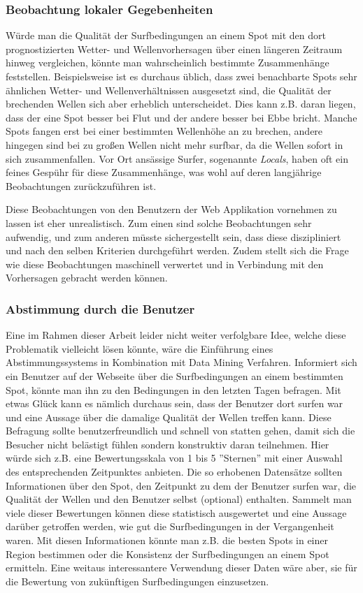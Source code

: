 \subsubsection{Beobachtung lokaler Gegebenheiten}
Würde man die Qualität der Surfbedingungen an einem Spot mit den dort
prognostizierten Wetter- und Wellenvorhersagen über einen längeren
Zeitraum hinweg vergleichen, könnte man wahrscheinlich bestimmte
Zusammenhänge feststellen. Beispielsweise ist es durchaus üblich, dass
zwei benachbarte Spots sehr ähnlichen Wetter- und Wellenverhältnissen
ausgesetzt sind, die Qualität der brechenden Wellen sich aber
erheblich unterscheidet. Dies kann z.B. daran liegen, dass der eine
Spot besser bei Flut und der andere besser bei Ebbe bricht. Manche
Spots fangen erst bei einer bestimmten Wellenhöhe an zu brechen,
andere hingegen sind bei zu großen Wellen nicht mehr surfbar, da die
Wellen sofort in sich zusammenfallen. Vor Ort ansässige Surfer,
sogenannte \textit{Locals}, haben oft ein feines Gespühr für diese
Zusammenhänge, was wohl auf deren langjährige Beobachtungen
zurückzuführen ist.

Diese Beobachtungen von den Benutzern der Web Applikation vornehmen zu
lassen ist eher unrealistisch. Zum einen sind solche Beobachtungen
sehr aufwendig, und zum anderen müsste sichergestellt sein, dass diese
diszipliniert und nach den selben Kriterien durchgeführt werden. Zudem
stellt sich die Frage wie diese Beobachtungen maschinell verwertet und
in Verbindung mit den Vorhersagen gebracht werden können.

\subsubsection{Abstimmung durch die Benutzer}
Eine im Rahmen dieser Arbeit leider nicht weiter verfolgbare Idee,
welche diese Problematik vielleicht lösen könnte, wäre die Einführung
eines Abstimmungssystems in Kombination mit Data Mining
Verfahren. Informiert sich ein Benutzer auf der Webseite über die
Surfbedingungen an einem bestimmten Spot, könnte man ihn zu den
Bedingungen in den letzten Tagen befragen. Mit etwas Glück kann es
nämlich durchaus sein, dass der Benutzer dort surfen war und eine
Aussage über die damalige Qualität der Wellen treffen kann. Diese
Befragung sollte benutzerfreundlich und schnell von statten gehen,
damit sich die Besucher nicht belästigt fühlen sondern konstruktiv
daran teilnehmen. Hier würde sich z.B. eine Bewertungsskala von 1 bis
5 ''Sternen'' mit einer Auswahl des entsprechenden Zeitpunktes
anbieten. Die so erhobenen Datensätze sollten Informationen über den
Spot, den Zeitpunkt zu dem der Benutzer surfen war, die Qualität der
Wellen und den Benutzer selbst (optional) enthalten. Sammelt man viele
dieser Bewertungen können diese statistisch ausgewertet und eine
Aussage darüber getroffen werden, wie gut die Surfbedingungen in der
Vergangenheit waren. Mit diesen Informationen könnte man z.B. die
besten Spots in einer Region bestimmen oder die Konsistenz der
Surfbedingungen an einem Spot ermitteln. Eine weitaus interessantere
Verwendung dieser Daten wäre aber, sie für die Bewertung von
zukünftigen Surfbedingungen einzusetzen.

